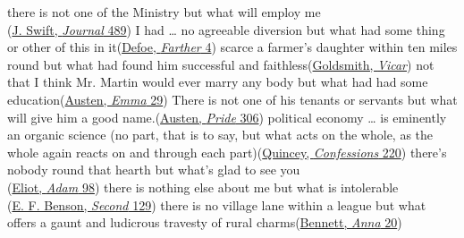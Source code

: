 \ea \label{ex:12-35}
\ea
there is not one of the Ministry but what will employ me\\\hfill(\href{https://archive.org/details/journaltostellae00swifuoft/page/488/mode/2up?q=%22not+one+of+the+ministry%22&view=theater}{J. Swift, \textit{Journal} 489})
\ex
\label{defoe_quote} I had {\dots} no agreeable diversion but what had some thing or other of this in it\hfill(\href{https://archive.org/details/fartheradventure00defo/page/4/mode/2up?q=%22agreeable%22&view=theater}{Defoe, \textit{Farther} 4}) %
\ex
scarce a farmer's daughter within ten miles round but what had found him successful and faithless\hfill(\href{https://archive.org/details/TheVicarOfWakefield/page/n63/mode/2up?q=%22Scarce+a+farmer%27s+daughter%22&view=theater}{Goldsmith, \textit{Vicar}}) %
\ex
not that I think Mr. Martin would ever marry any body but what had had some education\hfill(\href{https://archive.org/details/emma02unkngoog/page/n31/mode/2up?view=theater}{Austen, \textit{Emma} 29}) %
\ex
There is not one of his tenants or servants but what will give him a good name.\hfill(\href{https://archive.org/details/prideprejudice00aust/page/306/mode/2up?q=%22not+one+of+his+tenants%22&view=theater}{Austen, \textit{Pride} 306}) %
\ex
political economy {\dots} is eminently an organic science (no part, that is to say, but what acts on the whole, as the whole again reacts on and through each part)\hfill(\href{https://archive.org/details/bwb_KR-555-129/page/248/mode/2up?q=%22eminently%22&view=theater}{Quincey, \textit{Confessions} 220}) %
\ex
there's nobody round that hearth but what's glad to see you\\\hfill(\href{https://archive.org/details/adambede01eli/page/216/mode/2up?q=%22nobody+round+that+hearth%22&view=theater}{Eliot, \textit{Adam} 98})
\ex
there is nothing else about me but what is intolerable\\\hfill(\href{https://archive.org/details/dodosecond00bensiala/page/118/mode/2up?view=theater&q=%22nothing+else+about+me%22}{E. F. Benson, \textit{Second} 129})
\ex
there is no village lane within a league but what offers a gaunt and ludicrous travesty of rural charms\hfill(\href{https://archive.org/details/annaoffivetownsn00benniala/annaoffivetownsn00benniala/page/14/mode/2up?q=%22village+lane+within+a+league%22&view=theater}{Bennett, \textit{Anna} 20}) %
\z
\z
{}

